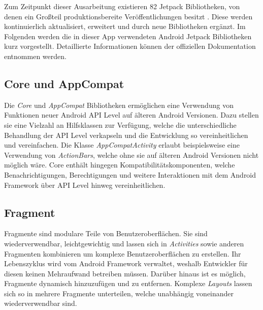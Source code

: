 Zum Zeitpunkt dieser Ausarbeitung existieren 82 Jetpack Bibliotheken, von denen ein Großteil produktionsbereite Veröffentlichungen besitzt \autocite{jetpackcount}.
Diese werden kontinuierlich aktualisiert, erweitert und durch neue Bibliotheken ergänzt.
Im Folgenden werden die in dieser App verwendeten Android Jetpack Bibliotheken kurz vorgestellt. Detaillierte Informationen können der offiziellen Dokumentation entnommen werden.

\subsection{Core und AppCompat}
\label{subsec:app:jetpack:base}
Die \textit{Core} und \textit{AppCompat} Bibliotheken ermöglichen eine Verwendung von Funktionen neuer Android API Level auf älteren Android Versionen.
Dazu stellen sie eine Vielzahl an Hilfsklassen zur Verfügung, welche die unterschiedliche Behandlung der API Level verkapseln und die Entwicklung so vereinheitlichen und vereinfachen.
Die Klasse \textit{AppCompatActivity} erlaubt beispielsweise eine Verwendung von \textit{ActionBars}, welche ohne sie auf älteren Android Versionen nicht möglich wäre.
Core enthält hingegen Kompatibilitätskomponenten, welche Benachrichtigungen, Berechtigungen und weitere Interaktionen mit dem Android Framework über API Level hinweg vereinheitlichen.

\subsection{Fragment}
\label{subsec:app:jetpack:fragment}
Fragmente sind modulare Teile von Benutzeroberflächen.
Sie sind wiederverwendbar, leichtgewichtig und lassen sich in \textit{Activities} sowie anderen Fragmenten kombinieren um komplexe Benutzeroberflächen zu erstellen.
Ihr Lebenszyklus wird vom Android Framework verwaltet, weshalb Entwickler für diesen keinen Mehraufwand betreiben müssen.
Darüber hinaus ist es möglich, Fragmente dynamisch hinzuzufügen und zu entfernen.
Komplexe \textit{Layouts} lassen sich so in mehrere Fragmente unterteilen, welche unabhängig voneinander wiederverwendbar sind.

